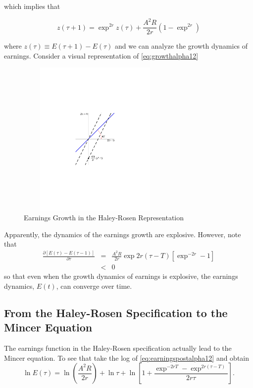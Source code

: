 \noindent which implies that

\begin{equation}
z(\tau + 1) = \exp^{2r} z(\tau) + \frac{A^2 R}{2r} \left( 1 - \exp^{2r} \right) \label{eq:growthalpha12}
\end{equation}

\noindent where $z(\tau) \equiv E(\tau + 1) - E(\tau)$ and we can analyze the growth dynamics of earnings. Consider a visual representation of \eqref{eq:growthalpha12}

\begin{center}
\begin{figure}[H]
\caption{Earnings Growth in the Haley-Rosen Representation}
\centering
\includegraphics[width=3in, height=3in]{Figures/fig-explode-converge.pdf}
\end{figure}
\end{center}

\indent Apparently, the dynamics of the earnings growth are explosive. However, note that
\begin{eqnarray}
\frac{\partial \left[ E(\tau) - E(\tau - 1) \right] }{\partial \tau} &=& \frac{A^2 R}{2r} \exp{2r(\tau - T)} \left[ \exp^{-2r} - 1 \right] \nonumber \\
&<& 0
\end{eqnarray}
so that even when the growth dynamics of earnings is explosive, the earnings dynamics, $E(t)$, can converge over time.

\subsection{From the Haley-Rosen Specification to the Mincer Equation}
The earnings function in the Haley-Rosen specification actually lead to the Mincer equation. To see that take the log of \eqref{eq:earningspostalpha12} and obtain
\begin{equation}
\ln E(\tau) = \ln \left( \frac{A^2 R}{ 2r} \right) + \ln \tau + \ln \left[ 1 + \frac{\exp^{-2rT} - \exp^{2r(\tau - T)} }{2r \tau} \right]. \label{eq:logs}
\end{equation}

